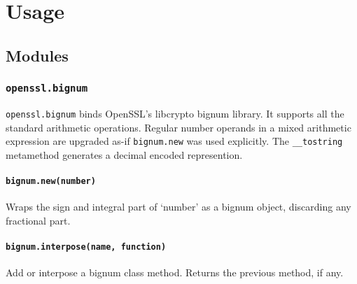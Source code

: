 \documentclass[11pt, oneside]{memoir}
\newcommand*{\fn}[1]{\texttt{#1}\xspace}
\newcommand*{\method}[1]{\texttt{#1}\xspace}
\newcommand*{\module}[1]{\texttt{#1}\xspace}
\newcounter{toccols}
\newenvironment{Module}[1]{
	\subsection{\texttt{#1}}
	\addtocontents{toc}{
		\protect\begin{multicols}{\value{toccols}}
	}
}{
	\addtocontents{toc}{\protect\end{multicols}}
}
\begin{document}
\chapter{Usage}

\section{Modules}

\begin{Module}{openssl.bignum}

\module{openssl.bignum} binds OpenSSL's libcrypto bignum library. It supports all the standard arithmetic operations. Regular number operands in a mixed arithmetic expression are upgraded as-if \method{bignum.new} was used explicitly. The \fn{\_\_tostring} metamethod generates a decimal encoded represention.

\subsubsection[\fn{bignum.new}]{\fn{bignum.new(number)}}

Wraps the sign and integral part of `number' as a bignum object, discarding any fractional part.

\subsubsection[\fn{bignum.interpose}]{\fn{bignum.interpose(name, function)}}

Add or interpose a bignum class method. Returns the previous method, if any.

\end{Module}
\end{document}
